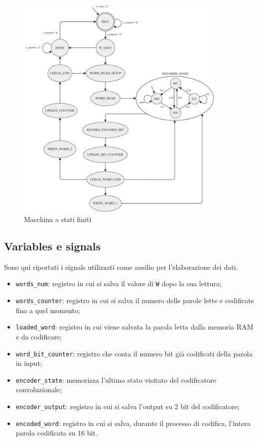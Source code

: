 \documentclass{article}
\begin{document}
\begin{figure}[h]
    \vspace{10pt}
    \centering
    \includegraphics[width=0.9\textwidth]{Resources/FSM.png}
    \vspace{2pt}
    \caption{Macchina a stati finiti}
    \label{fig:FSM}
\end{figure}

\newpage
\subsection{Variables e signals}
Sono qui riportati i signals utilizzati come ausilio per l'elaborazione dei dati.
\vspace{3.5pt}
\begin{itemize}
    \item \verb|words_num|: registro in cui si salva il valore di \verb|W| dopo la sua lettura;
    \item \verb|words_counter|: registro in cui si salva il numero delle parole lette e codificate fino a quel momento;
    \item \verb|loaded_word|: registro in cui viene salvata la parola letta dalla memoria RAM e da codificare;
    \item \verb|word_bit_counter|: registro che conta il numero bit già codificati della parola in input;
    \item \verb|encoder_state|: memorizza l'ultimo stato visitato del codificatore convoluzionale;
    \item \verb|encoder_output|: registro in cui si salva l'output su 2 bit del codificatore;
    \item \verb|encoded_word|: registro in cui si salva, durante il processo di codifica, l'intera parola codificata su 16 bit.
\end{itemize}
\end{document}
